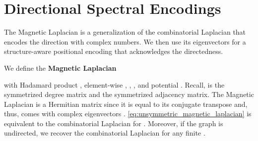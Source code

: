 \documentclass{article}
\begin{document}
\section{Directional Spectral Encodings}
\label{sec:spectral}

The Magnetic Laplacian is a generalization of the combinatorial Laplacian that encodes the direction with complex numbers. We then use its eigenvectors for a structure-aware positional encoding that acknowledges the directedness.

We define the \textbf{Magnetic Laplacian} ~\citep{forman_determinants_1993, shubin_discrete_1994, de_verdiere_magnetic_2013, furutani_graph_2020}

with Hadamard product , element-wise , ,
, and potential . 
Recall,  is the symmetrized degree matrix and  the symmetrized adjacency matrix. The Magnetic Laplacian is a Hermitian matrix since it is equal to its conjugate transpose  and, thus, comes with complex eigenvectors .  \autoref{eq:unsymmetric_magnetic_laplacian} is equivalent to the combinatorial Laplacian for . 
Moreover, if the graph is undirected, we recover the combinatorial Laplacian for any finite .
\end{document}
